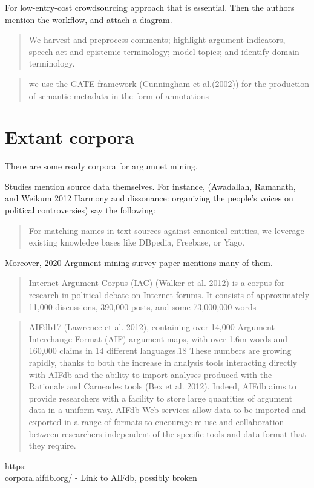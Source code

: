 \documentclass{report}
\begin{document}
For low-entry-cost crowdsourcing approach that is essential.
Then the authors mention the workflow, and attach a diagram.
\begin{quote}
 We harvest and preprocess comments; highlight argument indicators, speech act and epistemic terminology; model topics; and identify domain terminology.
\end{quote}
\begin{quote}
 we use the GATE framework (Cunningham et al.(2002)) for the production of semantic metadata in the form of annotations
\end{quote}

\section{Extant corpora}
There are some ready corpora for argumnet mining.

Studies mention source data themselves. 
For instance, (Awadallah, Ramanath, and Weikum 2012 Harmony and dissonance: organizing the people's voices on political controversies)
say the following:
\begin{quote}
 For matching names in text sources against canonical entities, we leverage existing knowledge bases like DBpedia, Freebase, or Yago.
\end{quote}

Moreover, 2020 Argument mining survey paper \cite{lawrence_argument_2020} mentions many of them.

\begin{quote}
 Internet Argument Corpus (IAC) (Walker et al. 2012) is a corpus for research in political debate on Internet forums. It consists of approximately 11,000 discussions, 390,000 posts, and some 73,000,000 words
\end{quote}
\begin{quote}
 AIFdb17 (Lawrence et al. 2012), containing over 14,000 Argument Interchange Format (AIF) argument maps, with over 1.6m words and 160,000 claims in 14 different languages.18 These numbers are growing rapidly, thanks to both the increase in analysis tools interacting directly with AIFdb and the ability to import analyses produced with the Rationale and Carneades tools (Bex et al. 2012). Indeed, AIFdb aims to provide researchers with a facility to store large quantities of argument data in a uniform way. AIFdb Web services allow data to be imported and exported in a range of formats to encourage re-use and collaboration between researchers independent of the specific tools and data format that they require.
\end{quote}
https:\\corpora.aifdb.org/ - Link to AIFdb, possibly broken
\end{document}
